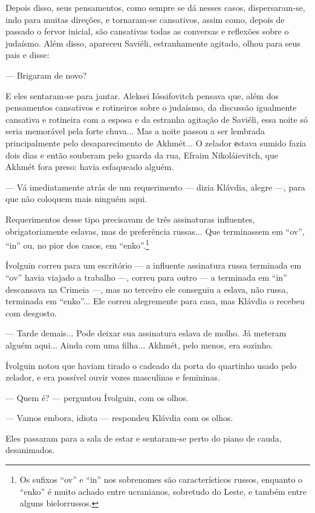 Depois disso, seus pensamentos, como sempre se dá nesses casos,
dispersaram-se, indo para muitas direções, e tornaram-se cansativos,
assim como, depois de passado o fervor inicial, são cansativas todas as
conversas e reflexões sobre o judaísmo. Além disso, apareceu Saviéli,
estranhamente agitado, olhou para seus pais e disse:

--- Brigaram de novo?

E eles sentaram-se para jantar. Aleksei Ióssifovitch pensava que, além
dos pensamentos cansativos e rotineiros sobre o judaísmo, da discussão
igualmente cansativa e rotineira com a esposa e da estranha agitação de
Saviéli, essa noite só seria memorável pela forte chuva... Mas a noite
passou a ser lembrada principalmente pelo desaparecimento de Akhmét... O
zelador еstava sumido fazia dois dias e então souberam pelo guarda da
rua, Efraim Nikoláievitch, que Akhmét fora preso: havia esfaqueado
alguém.

--- Vá imediatamente atrás de um requerimento --- dizia Klávdia, alegre
---, para que não coloquem mais ninguém aqui.

Requerimentos desse tipo precisavam de três assinaturas influentes,
obrigatoriamente eslavas, mas de preferência russas... Que terminassem
em ``ov'', ``in'' ou, no pior dos casos, em ``enko''.\footnote{Os
  sufixos ``ov'' e ``in'' nos sobrenomes são característicos russos,
  enquanto o ``enko'' é muito achado entre ucranianos, sobretudo do
  Leste, e também entre alguns bielorrussos.}

Ívolguin correu para um escritório --- a influente assinatura russa
terminada em ``ov'' havia viajado a trabalho ---, correu para outro ---
a terminada em ``in'' descansava na Crimeia ---, mas no terceiro ele
conseguiu a eslava, não russa, terminada em ``enko''... Ele correu
alegremente para casa, mas Klávdia o recebeu com desgosto.

--- Tarde demais... Pode deixar sua assinatura eslava de molho. Já
meteram alguém aqui... Ainda com uma filha... Akhmét, pelo menos, era
sozinho.

Ívolguin notou que haviam tirado o cadeado da porta do quartinho usado
pelo zelador, e era possível ouvir vozes masculinas e femininas.

--- Quem é? --- perguntou Ívolguin, com os olhos.

--- Vamos embora, idiota --- respondeu Klávdia com os olhos.

Eles passaram para a sala de estar e sentaram-se perto do piano de
cauda, desanimados.


